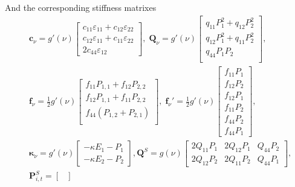 And the corresponding stiffness matrixes
\begin{equation}
\begin{split}
        &
        \mathbf{c}_\nu=g'(\nu)\begin{bmatrix}
            c_{11}\varepsilon_{11}+c_{12}\varepsilon_{22} \\
            c_{12}\varepsilon_{11}+c_{11}\varepsilon_{22} \\
            2c_{44}\varepsilon_{12}
        \end{bmatrix},\;
        \mathbf{Q}_\nu=g'(\nu)\begin{bmatrix}
            q_{11}P_1^2+q_{12}P_2^2 \\
            q_{12}P_1^2+q_{11}P_2^2 \\
            q_{44}P_1P_2 \\
        \end{bmatrix},\; \\
        &
        \mathbf{f}_\nu=\frac{1}{2}g'(\nu)\begin{bmatrix}
            f_{11}P_{1,1}+f_{12}P_{2,2} \\
            f_{12}P_{1,1}+f_{11}P_{2,2} \\
            f_{44}(P_{1,2}+P_{2,1}) \\
        \end{bmatrix},\;        
        \mathbf{f}_\nu'=\frac{1}{2}g'(\nu)\begin{bmatrix}
            f_{11}P_1 \\
            f_{12}P_2 \\
            f_{12}P_1 \\
            f_{11}P_2 \\
            f_{44}P_2 \\
            f_{44}P_1
        \end{bmatrix}, \\
        &
        \mathbf{\kappa}_\nu=g'(\nu)\begin{bmatrix}
            -\kappa E_1 - P_1 \\
            -\kappa E_2 - P_2 
        \end{bmatrix},
        \mathbf{Q}^S=g(\nu)\begin{bmatrix}
            2Q_{11}P_1 & 2Q_{12}P_1 & Q_{44}P_2 \\
            2Q_{12}P_2 & 2Q_{11}P_2 & Q_{44}P_1
        \end{bmatrix}, \\
        &
        \mathbf{P}_{i,t}^S=\begin{bmatrix}

\end{bmatrix}
\end{split}
\end{equation}
